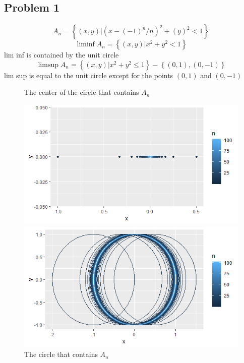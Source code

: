 \documentclass{article}
\begin{document}
\begin{flushleft}
\section*{Problem 1}
\[A_n = \left\{(x,y)|(x-(-1)^n/n)^2+(y)^2<1 \right\}
\]
\[\liminf A_n = \left\{(x,y)|x^2+y^2<1 \right\}
\]
lim inf is contained by the unit circle
\[\limsup A_n=\left\{(x,y)|x^2+y^2\leq 1\right\} -\left\{(0,1),(0,-1) \right\}
\]
lim sup is equal to the unit circle except for the points $(0,1)$ and $(0,-1)$
\begin{figure}[H]
\caption{The center of the circle that contains $A_n$}
\includegraphics[scale=.85]{pointscircle.png}
\caption{The circle that contains $A_n$}
\includegraphics[scale=.85]{circles-100.png}
\end{figure}

\end{flushleft}
\end{document}
